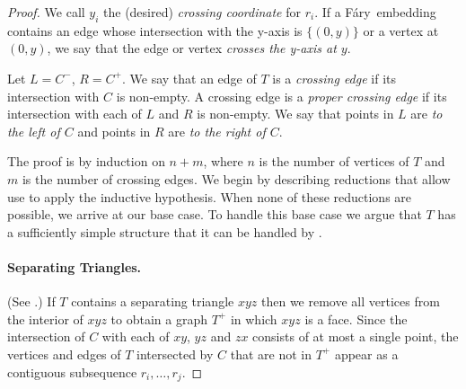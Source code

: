 \documentclass{patmorin}
\newcommand{\Fary}{Fáry}
\begin{document}
\begin{proof}
   We call $y_i$ the (desired) \emph{crossing coordinate} for $r_i$. If
   a \Fary\ embedding contains an edge whose intersection with the
   y-axis is $\{(0,y)\}$ or a vertex at $(0,y)$, we say that the edge
   or vertex \emph{crosses the y-axis at $y$}.

   Let $L=C^-$, $R=C^+$.  We say that an edge of $T$ is a \emph{crossing
   edge} if its intersection with $C$ is non-empty.  A crossing edge is
   a \emph{proper crossing edge} if its intersection with each of $L$
   and $R$ is non-empty.  We say that points in $L$ are \emph{to the
   left of $C$} and points in $R$ are \emph{to the right of $C$}.


%

   The proof is by induction on $n+m$, where $n$ is the number of
   vertices of $T$ and $m$ is the number of crossing edges.  We begin
   by describing reductions that allow use to apply the inductive
   hypothesis. When none of these reductions are possible, we arrive
   at our base case. To handle this base case we argue that $T$ has a
   sufficiently simple structure that it can be handled by .

   \paragraph{Separating Triangles.}
   (See .)
   If $T$ contains a separating triangle
   $xyz$ then we remove all vertices from the interior of $xyz$ to obtain
   a graph $T^+$ in which $xyz$ is a face.  Since the intersection of $C$
   with each of $xy$, $yz$ and $zx$ consists of at most a single point,
   the vertices and edges of $T$ intersected by $C$ that are not in $T^+$
   appear as a contiguous subsequence $r_i,\ldots,r_j$.


\end{proof}
\end{document}
